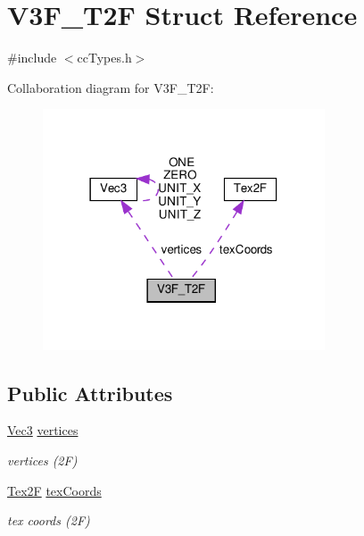 \hypertarget{structV3F__T2F}{}\section{V3\+F\+\_\+\+T2F Struct Reference}
\label{structV3F__T2F}


{\ttfamily \#include $<$cc\+Types.\+h$>$}



Collaboration diagram for V3\+F\+\_\+\+T2F\+:
\nopagebreak
\begin{figure}[H]
\begin{center}
\leavevmode
\includegraphics[width=237pt]{structV3F__T2F__coll__graph}
\end{center}
\end{figure}
\subsection*{Public Attributes}
\begin{DoxyCompactItemize}
\item 
\mbox{\label{structV3F__T2F_af481811a4820e56efdfa60e8ccbc5dda}} 
\hyperlink{classVec3}{Vec3} \hyperlink{structV3F__T2F_af481811a4820e56efdfa60e8ccbc5dda}{vertices}
\begin{DoxyCompactList}\small\item\em vertices (2F) \end{DoxyCompactList}\item 
\mbox{\label{structV3F__T2F_a4a913d993329529f82881cd9c1360adc}} 
\hyperlink{structTex2F}{Tex2F} \hyperlink{structV3F__T2F_a4a913d993329529f82881cd9c1360adc}{tex\+Coords}
\begin{DoxyCompactList}\small\item\em tex coords (2F) \end{DoxyCompactList}\end{DoxyCompactItemize}


